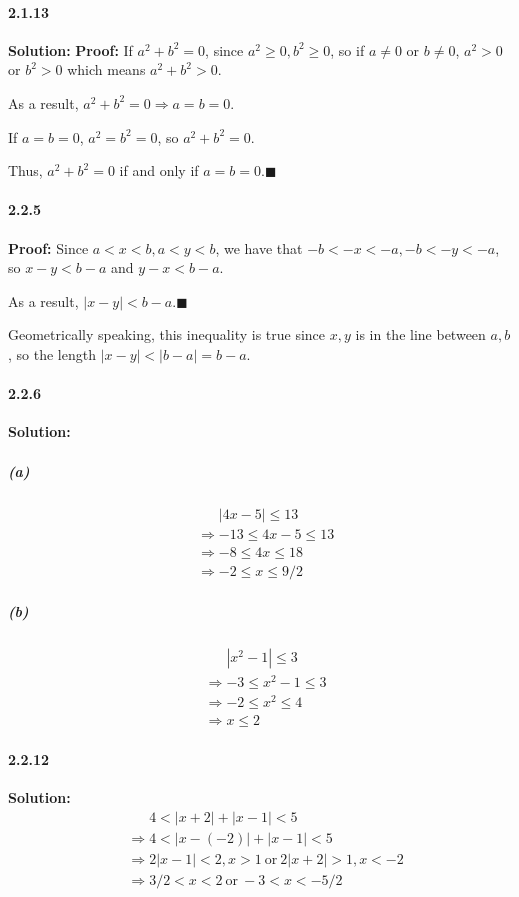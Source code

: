\documentclass[11pt]{article}
\begin{document}
	\paragraph{2.1.13}\textbf{Solution:}
		\textbf{Proof:}
		If $a^2 + b^2 = 0$, since $a^2 \geq 0, b^2 \geq 0$, so if $a \neq 0$ or $b \neq 0$, $a^2 > 0$ or $b^2 > 0$ which means $a^2 + b^2 > 0$.
		
		As a result, $a^2 + b^2 = 0 \Rightarrow a = b = 0$.
		
		If $a = b = 0$, $a^2 = b^2 = 0$, so $a^2+ b^2 = 0$.
		
		Thus, $a^2 + b^2 = 0$ if and only if $a = b = 0$.$\blacksquare$
	\paragraph{2.2.5}\textbf{Proof:}
		Since $a < x < b, a < y < b$, we have that $-b < -x < -a, -b < -y < -a$, so $x - y < b - a$ and $y - x < b - a$.
		
		As a result, $|x - y| < b - a$.$\blacksquare$
		
		Geometrically speaking, this inequality is true since $x, y$ is in the line between $a, b$, so the length $|x - y| < |b - a| = b - a$.
					
	\paragraph{2.2.6}\textbf{Solution:}
		\subparagraph{(a)}
			\begin{align}
				& \phantom{\Rightarrow} |4x - 5| \leq 13\nonumber\\
				& \Rightarrow -13 \leq 4x - 5 \leq 13\nonumber\\
				& \Rightarrow -8 \leq 4x \leq 18\nonumber\\
				& \Rightarrow -2 \leq x \leq 9/2\nonumber
			\end{align}
		\subparagraph{(b)}
			\begin{align}
				& \phantom{\Rightarrow} |x^2 - 1| \leq 3\nonumber\\
				& \Rightarrow -3 \leq x^2 - 1 \leq 3\nonumber\\
				& \Rightarrow -2 \leq x^2 \leq 4\nonumber\\
				& \Rightarrow x \leq 2\nonumber
			\end{align}
	\paragraph{2.2.12}\textbf{Solution:}
		\begin{align}
			& \phantom{\Rightarrow} 4 < |x + 2| + |x - 1| < 5\nonumber\\
			& \Rightarrow 4 < |x - (-2)| + |x - 1| < 5\nonumber\\
			& \Rightarrow 2|x - 1| < 2, x > 1\mathrm{\ or\ } 2|x + 2| > 1, x < -2\nonumber\\
			& \Rightarrow 3/2 < x < 2\mathrm{\ or\ } -3 < x < -5/2\nonumber
		\end{align}
\end{document}
